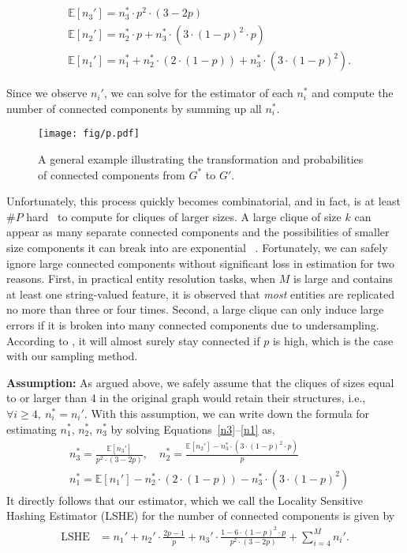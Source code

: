 \documentclass{imsart}
\begin{document}
\begin{align}
\label{n3}
&\mathbb{E}[n_3']= n_3^* \cdot p^2 \cdot (3-2p) \\
&\mathbb{E}[n_2'] = n_2^* \cdot p + n_3^*\cdot (3\cdot(1-p)^2\cdot p) \\
\label{n1}
&\mathbb{E}[n_1'] = n_1^* + n_2^* \cdot(2\cdot(1-p)) + n_3^* \cdot (3\cdot (1-p)^2).
\end{align}

Since we observe $n_i'$,  we can solve for the estimator of each $n_i^*$ and compute the number of connected components by summing up all $n_i^*$.

\begin{figure}[ht]
	\begin{center}
		\texttt{[image: fig/p.pdf]}
		\caption{A general example illustrating the transformation and probabilities of connected components from $G^*$ to $G'.$}
		\label{p}
	\end{center}
	\vskip -0.2in
\end{figure}

Unfortunately, this process quickly becomes combinatorial, and in fact, is at least $\#P$ hard~\citep{doi:10.1137/0212053} to compute for cliques of larger sizes. A large clique of size $k$ can appear as many separate connected components and the possibilities of smaller size components it can break into are exponential ~\citep{wiki:xxx}.
%
Fortunately, we can safely ignore large connected components without significant loss in estimation for two reasons.
First, in practical entity resolution tasks, when $M$ is large and contains at least one string-valued feature, it is observed that \emph{most} entities are replicated no more than three or four times. Second,  a large clique can only induce large errors if it is broken into many connected components due to undersampling. According to \cite{erdos1960evolution}, it will almost surely stay connected if $p$ is high, which is the case with our sampling method.

{\bf Assumption:} As argued above, we safely assume that the cliques of sizes equal to or larger than 4 in the original graph would retain their structures, i.e., $\forall i \ge 4, \ n_i^* = n_i'$. With this assumption, we can write down the formula for estimating $n_1^*$, $n_2^*$, $n_3^*$ by solving Equations~\ref{n3}--\ref{n1} as,
\begin{align}
&n_3^*= \frac{\mathbb{E}[n_3']}{p^2 \cdot (3-2p) }, \quad n_2^* = \frac{\mathbb{E}[n_2'] - n_3^*\cdot (3\cdot(1-p)^2\cdot p)}{p}  \\
&n_1^* = \mathbb{E}[n_1'] - n_2^* \cdot(2\cdot(1-p)) - n_3^* \cdot (3\cdot (1-p)^2)
\end{align}
It directly follows that our estimator, which we call the Locality Sensitive Hashing Estimator (LSHE) for the number of connected components is given by
\begin{align}
\label{main}
\text{LSHE} &= n_1' +  n_2' \cdot \frac{2p-1}{p}  + n_3' \cdot \frac{1-6 \cdot (1-p)^2 \cdot p}{p^2 \cdot (3-2p) }
+ \sum_{i=4}^{M}n_i'.
\end{align}
\end{document}
